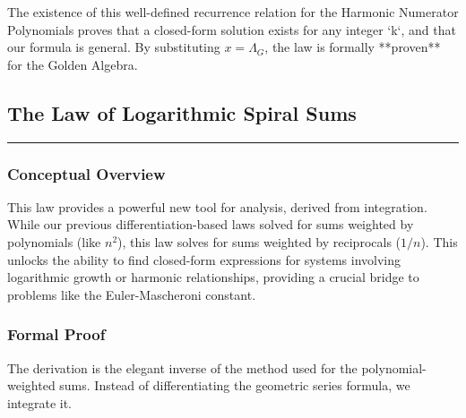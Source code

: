 The existence of this well-defined recurrence relation for the Harmonic Numerator Polynomials proves that a closed-form solution exists for any integer `k`, and that our formula is general. By substituting $x = \Lambda_G$, the law is formally **proven** for the Golden Algebra.

\subsection*{The Law of Logarithmic Spiral Sums}
\hrule
\vspace{0.3cm}
\vspace{0.5cm}

\subsubsection*{Conceptual Overview}
This law provides a powerful new tool for analysis, derived from integration. While our previous differentiation-based laws solved for sums weighted by polynomials (like $n^2$), this law solves for sums weighted by reciprocals ($1/n$). This unlocks the ability to find closed-form expressions for systems involving logarithmic growth or harmonic relationships, providing a crucial bridge to problems like the Euler-Mascheroni constant.

\subsubsection*{Formal Proof}
The derivation is the elegant inverse of the method used for the polynomial-weighted sums. Instead of differentiating the geometric series formula, we integrate it.

